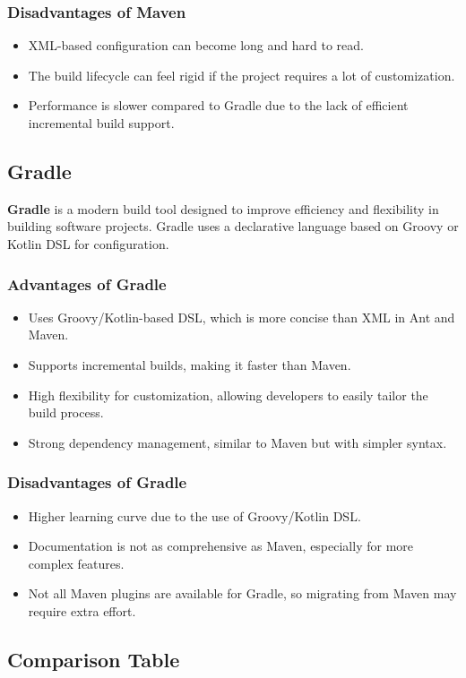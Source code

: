 \documentclass[aspectratio=169, table]{beamer}
\begin{document}
\begin{frame}[fragile]
	\frametitle{Disadvantages of Maven}
	\begin{itemize}
		\item XML-based configuration can become long and hard to read.
		\item The build lifecycle can feel rigid if the project requires a lot of customization.
		\item Performance is slower compared to Gradle due to the lack of efficient incremental build support.
	\end{itemize}
\end{frame}

\subsection{Gradle}

\begin{frame}[fragile]
	\textbf{Gradle} is a modern build tool designed to improve efficiency and flexibility in building software projects. Gradle uses a declarative language based on Groovy or Kotlin DSL for configuration.
	\frametitle{Advantages of Gradle}
	\begin{itemize}
		\item Uses Groovy/Kotlin-based DSL, which is more concise than XML in Ant and Maven.
		\item Supports incremental builds, making it faster than Maven.
		\item High flexibility for customization, allowing developers to easily tailor the build process.
		\item Strong dependency management, similar to Maven but with simpler syntax.
	\end{itemize}
\end{frame}

\begin{frame}[fragile]
	\frametitle{Disadvantages of Gradle}
	\begin{itemize}
		\item Higher learning curve due to the use of Groovy/Kotlin DSL.
		\item Documentation is not as comprehensive as Maven, especially for more complex features.
		\item Not all Maven plugins are available for Gradle, so migrating from Maven may require extra effort.
	\end{itemize}
\end{frame}

\subsection{Comparison Table}
\end{document}
